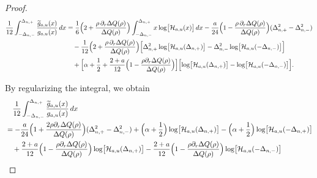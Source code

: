 \documentclass[reqno]{amsart}
\newcommand{\1}{\mathds{1}}
\numberwithin{equation}{section}
\theoremstyle{definition}
\begin{document}
\begin{proof}
\begin{align*}
\frac{1}{12}\int_{-\Delta_{n,-}}^{\Delta_{n,+}}
\frac{\widetilde{g}_{a,u}(x)}{g_{a,u}(x)}\,dx
&=
\frac{1}{6}\Bigl(2+\frac{\rho\,\partial_r\Delta Q(\rho)}{\Delta Q(\rho)}\Bigr)
\int_{-\Delta_{n,-}}^{\Delta_{n,+}}
x\log\bigl[\mathcal{H}_{a,u}(x)\bigr]\,dx
-\frac{a}{24}\Bigl(1-\frac{\rho\,\partial_r\Delta Q(\rho)}{\Delta Q(\rho)}\Bigr)(\Delta_{n,+}^2-\Delta_{n,-}^2)
\\
&
\quad
-\frac{1}{12}\Bigl(2+\frac{\rho\,\partial_r\Delta Q(\rho)}{\Delta Q(\rho)}\Bigr)\Bigl[\Delta_{n,+}^2
\log\bigl[\mathcal{H}_{a,u}(\Delta_{n,+})\bigr]
-\Delta_{n,-}^2
\log\bigl[\mathcal{H}_{a,u}(-\Delta_{n,-})\bigr]\Bigr]
\\
&
\quad
+\Bigl[
\alpha+\frac{1}{2}+\frac{2+a}{12}\Bigl(1-\frac{\rho\partial_r\Delta Q(\rho)}{\Delta Q(\rho)}\Bigr)\Bigr]
\Bigl[\log\bigl[\mathcal{H}_{a,u}(\Delta_{n,+})\bigr]-\log\bigl[\mathcal{H}_{a,u}(-\Delta_{n,-})\bigr]\Bigr]. 
\end{align*}

By regularizing the integral, we obtain 
\begin{align*}
&\quad \frac{1}{12}\int_{-\Delta_{n,-}}^{\Delta_{n,+}}
\frac{\widetilde{g}_{a,u}(x)}{g_{a,u}(x)}\,dx
\\
&=
-\frac{a}{24}\Bigl(1+\frac{2\rho\partial_r\Delta Q(\rho)}{\Delta Q(\rho)}\Bigr)(\Delta_{n,+}^2-\Delta_{n,-}^2)
+\Bigl(\alpha+\frac{1}{2}\Bigr)
\log\bigl[\mathcal{H}_{a,u}(\Delta_{n,+})\bigr]
-
\Bigl(\alpha+\frac{1}{2}\Bigr)
\log\bigl[\mathcal{H}_{a,u}(-\Delta_{n,+})\bigr]
\\
&\quad
+
\frac{2+a}{12}\Bigl(1-\frac{\rho\partial_r\Delta Q(\rho)}{\Delta Q(\rho)}\Bigr)
\log\bigl[\mathcal{H}_{a,u}(\Delta_{n,+})\bigr]
-
\frac{2+a}{12}\Bigl(1-\frac{\rho\partial_r\Delta Q(\rho)}{\Delta Q(\rho)}\Bigr)
\log\bigl[\mathcal{H}_{a,u}(-\Delta_{n,-})\bigr]

\end{align*}
\end{proof}
\end{document}
